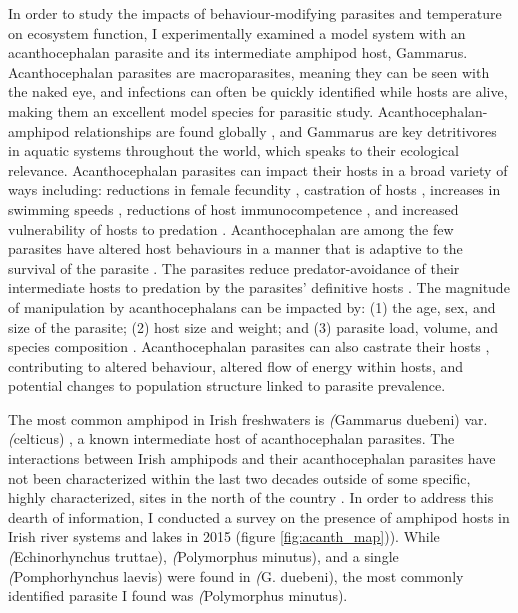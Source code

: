 In order to study the impacts of behaviour-modifying parasites and temperature on ecosystem function, I experimentally examined a model system with an acanthocephalan parasite and its intermediate amphipod host, Gammarus. Acanthocephalan parasites are macroparasites, meaning they can be seen with the naked eye, and infections can often be quickly identified while hosts are alive, making them an excellent model species for parasitic study. Acanthocephalan-amphipod relationships are found globally \citep{hynes1958, tokeson1982}, and Gammarus are key detritivores in aquatic systems throughout the world, which speaks to their ecological relevance. Acanthocephalan parasites can impact their hosts in a broad variety of ways including: reductions in female fecundity \citep{dezfuli1999}, castration of hosts \citep{bailly2017}, increases in swimming speeds \citep{medoc2008}, reductions of host immunocompetence \citep{rigaud2003}, and increased vulnerability of hosts  to predation \citep{lagrue2007}. Acanthocephalan are among the few parasites have altered host behaviours in a manner that is adaptive to the survival of the parasite \citep{poulin1995}. The parasites reduce predator-avoidance of their intermediate hosts to predation by the parasites’ definitive hosts . The magnitude of manipulation by acanthocephalans can be impacted by: (1) the age, sex, and size of the parasite; (2) host size and weight; and (3) parasite load, volume, and species composition \citep{labaude2015}. Acanthocephalan parasites can also castrate their hosts \citep{bailly2017, kakizaki2003}, contributing to altered behaviour, altered flow of energy within hosts, and potential changes to population structure linked to parasite prevalence. 

The most common amphipod in Irish freshwaters is \emph(Gammarus duebeni) var. \emph(celticus) \citep{macneil2009, reid1938}, a known intermediate host of acanthocephalan parasites. The interactions between Irish amphipods and their acanthocephalan parasites have not been characterized within the last two decades outside of some specific, highly characterized, sites in the north of the country \citep{dick1993, dunn1998, lyndon1996}. In order to address this dearth of information, I conducted a survey on the presence of amphipod hosts in Irish river systems and lakes in 2015 (figure \ref{fig:acanth_map})). While \emph(Echinorhynchus truttae), \emph(Polymorphus minutus), and a single \emph(Pomphorhynchus laevis) were found in \emph(G. duebeni), the most commonly identified parasite I found was \emph(Polymorphus minutus). 

